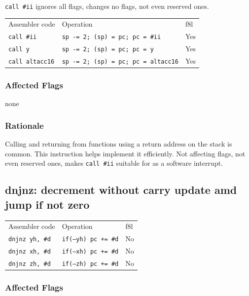 \documentclass{book}
\begin{document}
\texttt{call \#ii} ignores all flags, changes no flags, not even reserved ones.

\begin{tabular}{l l l}
Assembler code         & Operation                                  & f8l \\
\texttt{call \#ii}     & \texttt{sp -= 2; (sp) = pc; pc = \#ii}     & Yes \\
\texttt{call y}        & \texttt{sp -= 2; (sp) = pc; pc = y}        & Yes \\
\texttt{call altacc16} & \texttt{sp -= 2; (sp) = pc; pc = altacc16} & Yes \\
\end{tabular}

\subsubsection*{Affected Flags}

none

\subsubsection*{Rationale}

Calling and returning from functions using a return address on the stack is common. This instruction helps implement it efficiently. Not affecting flags, not even reserved ones, makes \texttt{call \#ii} suitable for as a software interrupt.


\subsection{dnjnz: decrement without carry update amd jump if not zero}

\begin{tabular}{l l l}
Assembler code         & Operation                   & f8l \\
\texttt{dnjnz yh, \#d} & \texttt{if(--yh) pc += \#d} & No \\
\texttt{dnjnz xh, \#d} & \texttt{if(--xh) pc += \#d} & No \\
\texttt{dnjnz zh, \#d} & \texttt{if(--zh) pc += \#d} & No \\
\end{tabular}

\subsubsection*{Affected Flags}
\end{document}
